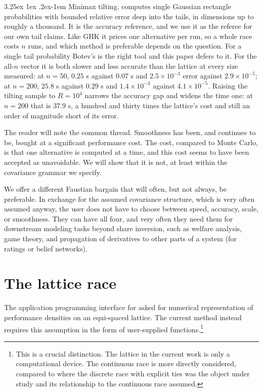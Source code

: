\documentclass[11pt]{article}
\makeatletter
\renewcommand\paragraph{\@startsection{paragraph}{4}{\z@}%
  {3.25ex \@plus1ex \@minus.2ex}{-1em}%
  {\normalfont\normalsize\itshape}}
\makeatother
\begin{document}
\paragraph{Minimax tilting.} \citet{botev2017} computes single Gaussian
rectangle probabilities with bounded relative error deep into the tails,
in dimensions up to roughly a thousand. It is the accuracy reference, and
we use it as the referee for our own tail claims. Like GHK it prices one
alternative per run, so a whole race costs $n$ runs, and which method is
preferable depends on the question. For a single tail probability Botev's
is the right tool and this paper defers to it. For the all-$n$ vector it
is both slower and less accurate than the lattice at every size measured:
at $n=50$, $0.25$ s against $0.07$ s and $2.5\times10^{-3}$ error against
$2.9\times10^{-5}$; at $n=200$, $25.8$ s against $0.29$ s and
$1.4\times10^{-3}$ against $4.1\times10^{-5}$. Raising the tilting sample
to $R=10^{4}$ narrows the accuracy gap and widens the time one: at
$n=200$ that is $37.9$ s, a hundred and thirty times the lattice's cost
and still an order of magnitude short of its error.

\medskip

The reader will note the common thread. Smoothness has been, and continues to be, bought at a significant performance cost. The cost, compared to Monte Carlo, is that one alternative is computed at a time, and this cost seems to have been accepted as unavoidable. We will show that it is not, at least within the covariance grammar we specify.

We offer a different Faustian bargain that will often, but not always, be preferable. In exchange for the assumed covariance structure, which is very often assumed anyway, the user does not have to choose between
speed, accuracy, scale, or smoothness. They can have all four, and very often they need them for downstream modeling tasks beyond share inversion, such as welfare analysis, game theory, and propagation of derivatives to other parts of a system (for ratings or belief networks).

\section{The lattice race}\label{sec:lattice}

The application programming interface for \citet{cotton2021} asked for numerical representation of performance densities on an equi-spaced lattice. The current method instead requires this assumption in the form of user-supplied functions.\footnote{This is a crucial distinction. The lattice in the current work is only a computational device. The continuous race is more directly considered, compared to \citet{cotton2021} where the discrete race with explicit ties was the object under study and its relationship to the continuous race assumed.}
\end{document}

